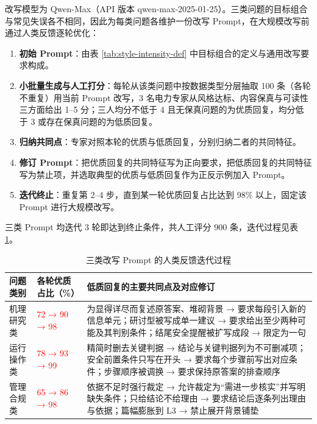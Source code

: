 \documentclass[fontset=fandol,type=master,campus=shenzhen,etitleauto=true]{hithesisbook}
\newcommand{\rev}[1]{\textcolor{red}{#1}}
\providecommand{\tightlist}{%
  \setlength{\itemsep}{0pt}\setlength{\parskip}{0pt}}
\begin{document}
改写模型为 Qwen-Max（API 版本 qwen-max-2025-01-25）。三类问题的目标组合与常见失误各不相同，因此为每类问题各维护一份改写 Prompt，在大规模改写前通过人类反馈逐轮优化：
\begin{enumerate}
\tightlist
\item \textbf{初始 Prompt}：由表 \ref{tab:style-intensity-def} 中目标组合的定义与通用改写要求构成。
\item \textbf{小批量生成与人工打分}：每轮从该类问题中按数据类型分层抽取 100 条（各轮不重复）用当前 Prompt 改写，3 名电力专家从风格达标、内容保真与可读性三方面给出 1--5 分；三人均分不低于 4 且无保真问题的为优质回复，均分低于 3 或存在保真问题的为低质回复。
\item \textbf{归纳共同点}：专家对照本轮的优质与低质回复，分别归纳二者的共同特征。
\item \textbf{修订 Prompt}：把优质回复的共同特征写为正向要求，把低质回复的共同特征写为禁止项，并选取典型的优质与低质回复作为正反示例加入 Prompt。
\item \textbf{迭代终止}：重复第 2--4 步，直到某一轮优质回复占比达到 98\% 以上，固定该 Prompt 进行大规模改写。
\end{enumerate}

三类 Prompt 均迭代 3 轮即达到终止条件，共人工评分 900 条，迭代过程见表 \ref{tab:rewrite-hf-iter}。

\begin{table}[htbp]
\centering
\caption{三类改写 Prompt 的人类反馈迭代过程}
\label{tab:rewrite-hf-iter}
\small
\setlength{\tabcolsep}{4pt}
\renewcommand{\arraystretch}{1.15}
\begin{tabular}{p{1.9cm}p{3.3cm}p{8.4cm}}
\toprule
\textbf{问题类别} & \textbf{各轮优质占比（\%）} & \textbf{低质回复的主要共同点及对应修订} \\
\midrule
机理研究类 & \rev{72 → 90 → 98} & 为显得详尽而复述原答案、堆砌背景 → 要求每段引入新的信息单元；研讨型被写成单一建议 → 要求给出至少两种可能及其判别条件；结尾安全提醒被扩写成段 → 限定为一句 \\
运行操作类 & \rev{78 → 93 → 99} & 精简时删去关键判据 → 结论与关键判据列为不可删减项；安全前置条件只写在开头 → 要求每个步骤前写出对应条件；步骤顺序被调换 → 要求保持原答案的排查顺序 \\
管理合规类 & \rev{65 → 86 → 98} & 依据不足时强行裁定 → 允许裁定为“需进一步核实”并写明缺失条件；只给结论不给理由 → 要求结论后逐条列出理由与依据；篇幅膨胀到 L3 → 禁止展开背景铺垫 \\
\bottomrule
\end{tabular}
\end{table}
\end{document}
